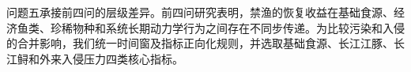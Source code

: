 问题五承接前四问的层级差异。前四问研究表明，禁渔的恢复收益在基础食源、经济鱼类、珍稀物种和系统长期动力学行为之间存在不同步传递。为比较污染和入侵的合并影响，我们统一时间窗及指标正向化规则，并选取基础食源、长江江豚、长江鲟和外来入侵压力四类核心指标。